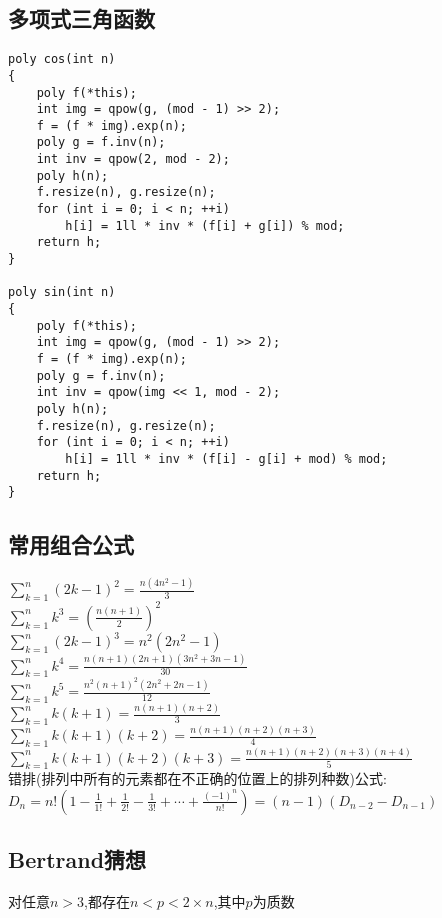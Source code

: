 \documentclass[twocolumn,a4]{article}
\begin{document}
\subsection{多项式三角函数}
\begin{lstlisting}
poly cos(int n)
{
    poly f(*this);
    int img = qpow(g, (mod - 1) >> 2);
    f = (f * img).exp(n);
    poly g = f.inv(n);
    int inv = qpow(2, mod - 2);
    poly h(n);
    f.resize(n), g.resize(n);
    for (int i = 0; i < n; ++i)
        h[i] = 1ll * inv * (f[i] + g[i]) % mod;
    return h;
}

poly sin(int n)
{
    poly f(*this);
    int img = qpow(g, (mod - 1) >> 2);
    f = (f * img).exp(n);
    poly g = f.inv(n);
    int inv = qpow(img << 1, mod - 2);
    poly h(n);
    f.resize(n), g.resize(n);
    for (int i = 0; i < n; ++i)
        h[i] = 1ll * inv * (f[i] - g[i] + mod) % mod;
    return h;
}
\end{lstlisting}
\subsection{常用组合公式}
$\displaystyle \sum_{k=1}^{n}(2k-1)^{2}=\frac{n(4n^{2}-1)}{3}$\\
$\displaystyle \sum_{k=1}^{n}k^{3}=\left(\frac{n(n+1)}{2}\right)^{2}$\\
$\displaystyle \sum_{k=1}^{n}(2k-1)^{3}=n^{2}(2n^{2}-1)$\\
$\displaystyle \sum_{k=1}^{n}k^{4}=\frac{n(n+1)(2n+1)(3n^{2}+3n-1)}{30}$\\
$\displaystyle \sum_{k=1}^{n}k^{5}=\frac{n^{2}(n+1)^{2}(2n^{2}+2n-1)}{12}$\\
$\displaystyle \sum_{k=1}^{n}k(k+1)=\frac{n(n+1)(n+2)}{3}$\\
$\displaystyle \sum_{k=1}^{n}k(k+1)(k+2)=\frac{n(n+1)(n+2)(n+3)}{4}$\\
$\displaystyle \sum_{k=1}^{n}k(k+1)(k+2)(k+3)=\frac{n(n+1)(n+2)(n+3)(n+4)}{5}$\\
错排(排列中所有的元素都在不正确的位置上的排列种数)公式:\\
$D_{n}=n!\left(1-\frac{1}{1!}+\frac{1}{2!}-\frac{1}{3!}+\cdots+\frac{(-1)^{n}}{n!}\right)=(n-1)(D_{n-2}-D_{n-1})$\\

\subsection{Bertrand猜想}
对任意$n>3$,都存在$n<p<2\times n$,其中$p$为质数\\
\end{document}
